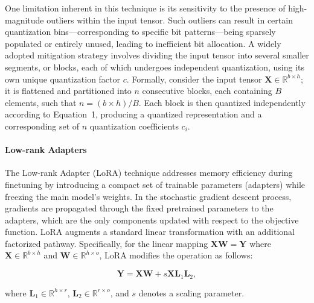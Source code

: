 One limitation inherent in this technique is its sensitivity to the presence of high-magnitude outliers within the input tensor. Such outliers can result in certain quantization bins—corresponding to specific bit patterns—being sparsely populated or entirely unused, leading to inefficient bit allocation. A widely adopted mitigation strategy involves dividing the input tensor into several smaller segments, or blocks, each of which undergoes independent quantization, using its own unique quantization factor $c$. Formally, consider the input tensor $\mathbf{X}\in \mathbb{R}^{b\times h}$; it is flattened and partitioned into $n$ consecutive blocks, each containing $B$ elements, such that ${n = ({b\times h} )/{B} }$. Each block is then quantized independently according to Equation~1, producing a quantized representation and a corresponding set of $n$ quantization coefficients $c_i$.

\paragraph{Low-rank Adapters} The Low-rank Adapter (LoRA) technique \citep{hu2021lora} addresses memory efficiency during finetuning by introducing a compact set of trainable parameters (adapters) while freezing the main model’s weights. In the stochastic gradient descent process, gradients are propagated through the fixed pretrained parameters to the adapters, which are the only components updated with respect to the objective function. LoRA augments a standard linear transformation with an additional factorized pathway. Specifically, for the linear mapping ${\mathbf{X} \mathbf{W} = \mathbf{Y}}$ where $\mathbf{X}\in  \mathbb{R}^{b\times h}$ and $\mathbf{W}\in  \mathbb{R}^{h\times o}$, LoRA modifies the operation as follows:

\begin{equation}
    \mathbf{Y} = \mathbf{X}\mathbf{W} + s\mathbf{X}\mathbf{L}_1\mathbf{L}_2,
\end{equation}

where $\mathbf{L}_1\in  \mathbb{R}^{h\times r}$, $\mathbf{L}_2\in  \mathbb{R}^{r\times o}$, and $s$ denotes a scaling parameter.

